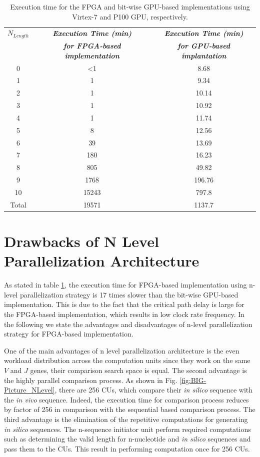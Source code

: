 \begin{table}[t!]
\caption{Execution time for the FPGA and bit-wise GPU-based implementations using Virtex-7 and P100 GPU, respectively.}
\begin{center}
\begin{tabular}{ |c|c|c|}
  \hline
  \textbf{\textit{ $N_{Length}$}} & \textbf{\textit{Execution Time (min)}} &\textbf{\textit{Execution Time (min)}} \\
  ~&\textbf{\textit{for FPGA-based implementation}}& \textbf{\textit{for GPU-based implantation}} \\	\hline
	0	&\textless 1	 	& 8.68   \\	\hline	
	1	&1	 	&  9.34 \\	\hline	
	2	&1	& 10.14 \\	\hline	
	3	&1	 	& 10.92 \\	\hline	
	4	&1	 	& 11.74 \\	\hline	
	5	&8	  & 12.56 \\	\hline	
	6	&39   &13.69     \\	\hline
	7	&180  &16.23    \\	\hline
	8	&805 &49.82    \\	\hline
	9	&1768 & 196.76   \\	\hline
	10	& 15243  & 797.8  \\	\hline	
   	Total & 19571& 1137.7 \\	
  \hline
\end{tabular}
  \label{tab:4}
\end{center}
\end{table}

\section{Drawbacks of N Level Parallelization Architecture}\label{sec:drawbackNlevel}
As stated in table \ref{tab:4}, the execution time for FPGA-based implementation using n-level parallelization strategy is 17 times slower than the bit-wise GPU-based implementation. This is due to the fact that the critical path delay is large for the FPGA-based implementation, which results in low clock rate frequency. In the following we state the advantages and disadvantages of n-level parallelization strategy for FPGA-based implementation.
 
One of the main advantages of n level parallelization architecture is the even workload distribution across the computation units since they work on the same $V$ and $J$ genes, their comparison search space is equal. The second advantage is the highly parallel comparison process. As shown in Fig. \ref{fig:BIG-Picture_NLevel}, there are 256 CUs, which compare their \emph{in silico} sequence with the \emph{in vivo} sequence. Indeed, the execution time for comparison process reduces by factor of 256 in comparison with the sequential based comparison process. The third advantage is the elimination of the repetitive computations for generating \emph{in silico} sequences. The n-sequence initiator unit perform required computations such as determining the valid length for n-nucleotide and \emph{in silico} sequences and pass them to the CUs. This result in performing computation once for 256 CUs.

